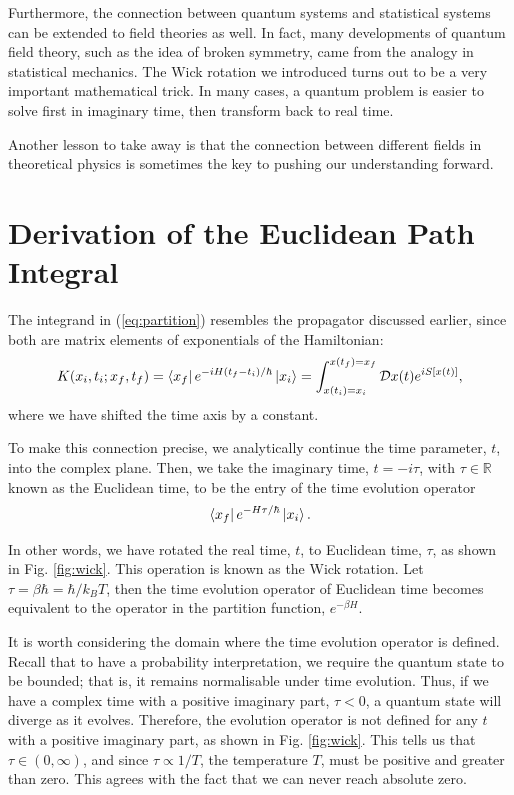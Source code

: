 \documentclass[12pt,a4paper]{article}
\begin{document}
Furthermore, the connection between quantum systems and statistical systems can be extended to field theories as well. In fact, many developments of quantum field theory, such as the idea of broken symmetry, came from the analogy in statistical mechanics. The Wick rotation we introduced turns out to be a very important mathematical trick. In many cases, a quantum problem is easier to solve first in imaginary time, then transform back to real time.

Another lesson to take away is that the connection between different fields in theoretical physics is sometimes the key to pushing our understanding forward.

\newpage
\appendix
\section{Derivation of the Euclidean Path Integral}
\label{app:wick}

The integrand in (\ref{eq:partition}) resembles the propagator discussed earlier, since both are matrix elements of exponentials of the Hamiltonian:
\begin{equation}
    K(x_i,t_i;x_f,t_f) = \bra{x_f}e^{-iH(t_f-t_i)/\hbar}\ket{x_i} = \int_{x(t_i)=x_i}^{x(t_f)=x_f} \mathcal{D}x(t)e^{iS[x(t)]},
\end{equation}
where we have shifted the time axis by a constant.

To make this connection precise, we analytically continue the time parameter, $t$, into the complex plane. Then, we take the imaginary time, $t=-i\tau$, with $\tau\in\mathbb{R}$ known as the Euclidean time, to be the entry of the time evolution operator
\begin{equation}
    \bra{x_f}e^{-H\tau/\hbar}\ket{x_i}.
\end{equation}

In other words, we have rotated the real time, $t$, to Euclidean time, $\tau$, as shown in Fig. \ref{fig:wick}. This operation is known as the Wick rotation.
Let $\tau = \beta\hbar = \hbar/k_BT$, then the time evolution operator of Euclidean time becomes equivalent to the operator in the partition function, $e^{-\beta H}$.


It is worth considering the domain where the time evolution operator is defined.
Recall that to have a probability interpretation, we require the quantum state to be bounded; that is, it remains normalisable under time evolution.
Thus, if we have a complex time with a positive imaginary part, $\tau<0$, a quantum state will diverge as it evolves.
Therefore, the evolution operator is not defined for any $t$ with a positive imaginary part, as shown in Fig. \ref{fig:wick}.
This tells us that $\tau \in (0,\infty)$, and since $\tau \propto 1/T$, the temperature $T$, must be positive and greater than zero.
This agrees with the fact that we can never reach absolute zero.
\end{document}
